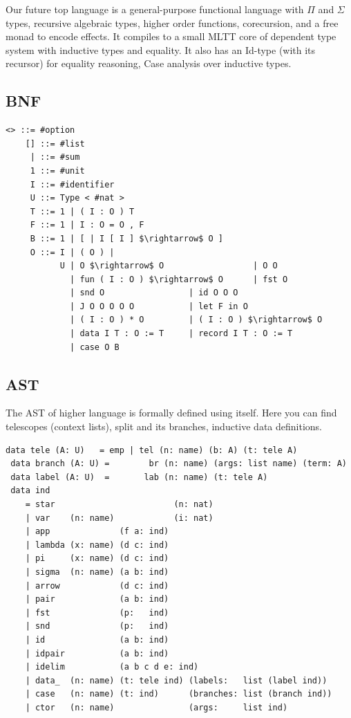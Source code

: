 \documentclass{aip-cp}
\begin{document}
Our future top language is a general-purpose functional language with $\Pi$ and $\Sigma$ types,
recursive algebraic types, higher order functions,
corecursion, and a free monad to encode effects. It compiles
to a small MLTT core of dependent type system with inductive types and equality.
It also has an Id-type (with its recursor) for equality reasoning,
Case analysis over inductive types.

\subsection{BNF}

\begin{lstlisting}[mathescape=true]
    <> ::= #option
    [] ::= #list
     | ::= #sum
     1 ::= #unit
     I ::= #identifier
     U ::= Type < #nat >
     T ::= 1 | ( I : O ) T
     F ::= 1 | I : O = O , F
     B ::= 1 | [ | I [ I ] $\rightarrow$ O ]
     O ::= I | ( O ) |
           U | O $\rightarrow$ O                  | O O
             | fun ( I : O ) $\rightarrow$ O      | fst O
             | snd O                 | id O O O
             | J O O O O O           | let F in O
             | ( I : O ) * O         | ( I : O ) $\rightarrow$ O
             | data I T : O := T     | record I T : O := T
             | case O B
\end{lstlisting}

\subsection{AST}
The AST of higher language is formally defined using itself.
Here you can find telescopes (context lists), split and its branches,
inductive data definitions.

\begin{lstlisting}[mathescape=true]
 data tele (A: U)   = emp | tel (n: name) (b: A) (t: tele A)
 data branch (A: U) =        br (n: name) (args: list name) (term: A)
 data label (A: U)  =       lab (n: name) (t: tele A)
 data ind
    = star                        (n: nat)
    | var    (n: name)            (i: nat)
    | app              (f a: ind)
    | lambda (x: name) (d c: ind)
    | pi     (x: name) (d c: ind)
    | sigma  (n: name) (a b: ind)
    | arrow            (d c: ind)
    | pair             (a b: ind)
    | fst              (p:   ind)
    | snd              (p:   ind)
    | id               (a b: ind)
    | idpair           (a b: ind)
    | idelim           (a b c d e: ind)
    | data_  (n: name) (t: tele ind) (labels:   list (label ind))
    | case   (n: name) (t: ind)      (branches: list (branch ind))
    | ctor   (n: name)               (args:     list ind)
\end{lstlisting}
\end{document}

